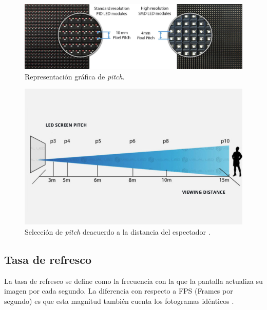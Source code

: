 \begin{figure}[htpb]
	\centering
	\includegraphics[scale=0.3]{Figures/pitch.jpg} 
	\caption{Representación gráfica de \textit{pitch}\protect\footnotemark.}
	\label{fig:pixelpitch}
\end{figure}

\begin{figure}[htpb]
	\centering
	\includegraphics[scale=0.6]{Figures/visionpitch.jpg} 
	\caption{Selección de \textit{pitch} deacuerdo a la distancia del espectador \protect\footnotemark.}
	\label{fig:pitchview}
\end{figure}


\subsection{Tasa de refresco}
La tasa de refresco se define como la frecuencia con la que la pantalla actualiza su imagen por cada segundo. La diferencia con respecto a FPS (Frames por segundo) es que esta magnitud también cuenta los fotogramas idénticos \citep{WIKITASA}.




